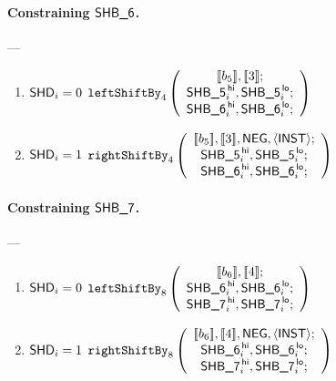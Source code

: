 \paragraph{Constraining $\textsf{SHB\_6}$.} ---
\begin{enumerate}
	\item \If $\textsf{SHD}_{i} = 0$ \Then $\texttt{leftShiftBy}_{4}\left(
	\begin{array}{c}
	[\![b_{5}]\!], [\![3]\!]; \\
	\textsf{SHB\_5}^{\mathsf{\,hi}}_{i}, \textsf{SHB\_5}^{\mathsf{\,lo}}_{i}; \\
	\textsf{SHB\_6}^{\mathsf{\,hi}}_{i}, \textsf{SHB\_6}^{\mathsf{\,lo}}_{i}; \\
	\end{array}\right)$
	\item \If $\textsf{SHD}_{i} = 1$ \Then $\texttt{rightShiftBy}_{4}\left(
	\begin{array}{c}
	[\![b_{5}]\!], [\![3]\!], \textsf{NEG}, \langle{}\textsf{INST}\rangle{}; \\
	\textsf{SHB\_5}^{\mathsf{\,hi}}_{i}, \textsf{SHB\_5}^{\mathsf{\,lo}}_{i}; \\
	\textsf{SHB\_6}^{\mathsf{\,hi}}_{i}, \textsf{SHB\_6}^{\mathsf{\,lo}}_{i}; \\
	\end{array}\right)$
\end{enumerate}

\paragraph{Constraining $\textsf{SHB\_7}$.} ---
\begin{enumerate}
	\item \If $\textsf{SHD}_{i} = 0$ \Then $\texttt{leftShiftBy}_{8}\left(
	\begin{array}{c}
	[\![b_{6}]\!], [\![4]\!]; \\
	\textsf{SHB\_6}^{\mathsf{\,hi}}_{i}, \textsf{SHB\_6}^{\mathsf{\,lo}}_{i}; \\
	\textsf{SHB\_7}^{\mathsf{\,hi}}_{i}, \textsf{SHB\_7}^{\mathsf{\,lo}}_{i}; \\
	\end{array}\right)$
	\item \If $\textsf{SHD}_{i} = 1$ \Then $\texttt{rightShiftBy}_{8}\left(
	\begin{array}{c}
	[\![b_{6}]\!], [\![4]\!], \textsf{NEG}, \langle{}\textsf{INST}\rangle{}; \\
	\textsf{SHB\_6}^{\mathsf{\,hi}}_{i}, \textsf{SHB\_6}^{\mathsf{\,lo}}_{i}; \\
	\textsf{SHB\_7}^{\mathsf{\,hi}}_{i}, \textsf{SHB\_7}^{\mathsf{\,lo}}_{i}; \\
	\end{array}\right)$
\end{enumerate}

